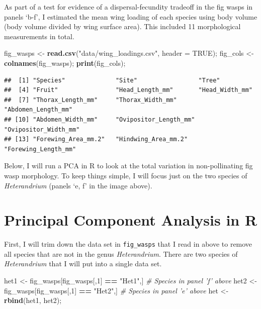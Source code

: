 \documentclass[]{article}
\newenvironment{Shaded}{\begin{snugshade}}{\end{snugshade}}
\newcommand{\CommentTok}[1]{\textcolor[rgb]{0.56,0.35,0.01}{\textit{#1}}}
\newcommand{\DataTypeTok}[1]{\textcolor[rgb]{0.13,0.29,0.53}{#1}}
\newcommand{\DecValTok}[1]{\textcolor[rgb]{0.00,0.00,0.81}{#1}}
\newcommand{\KeywordTok}[1]{\textcolor[rgb]{0.13,0.29,0.53}{\textbf{#1}}}
\newcommand{\NormalTok}[1]{#1}
\newcommand{\OperatorTok}[1]{\textcolor[rgb]{0.81,0.36,0.00}{\textbf{#1}}}
\newcommand{\OtherTok}[1]{\textcolor[rgb]{0.56,0.35,0.01}{#1}}
\newcommand{\StringTok}[1]{\textcolor[rgb]{0.31,0.60,0.02}{#1}}
\begin{document}
As part of a test for evidence of a dispersal-fecundity tradeoff in the
fig wasps in panels `b-f', I estimated the mean wing loading of each
species using body volume (body volume divided by wing surface area).
This included 11 morphological measurements in total.

\begin{Shaded}
\begin{Highlighting}[]
\NormalTok{fig_wasps    <-}\StringTok{ }\KeywordTok{read.csv}\NormalTok{(}\StringTok{"data/wing_loadings.csv"}\NormalTok{, }\DataTypeTok{header =} \OtherTok{TRUE}\NormalTok{);}
\NormalTok{fig_cols     <-}\StringTok{ }\KeywordTok{colnames}\NormalTok{(fig_wasps);}
\KeywordTok{print}\NormalTok{(fig_cols);}
\end{Highlighting}
\end{Shaded}

\begin{verbatim}
##  [1] "Species"              "Site"                 "Tree"                
##  [4] "Fruit"                "Head_Length_mm"       "Head_Width_mm"       
##  [7] "Thorax_Length_mm"     "Thorax_Width_mm"      "Abdomen_Length_mm"   
## [10] "Abdomen_Width_mm"     "Ovipositor_Length_mm" "Ovipositor_Width_mm" 
## [13] "Forewing_Area_mm.2"   "Hindwing_Area_mm.2"   "Forewing_Length_mm"
\end{verbatim}

Below, I will run a PCA in R to look at the total variation in
non-pollinating fig wasp morphology. To keep things simple, I will focus
just on the two species of \emph{Heterandrium} (panels `e, f' in the
image above).

\hypertarget{principal-component-analysis-in-r}{%
\section{Principal Component Analysis in
R}\label{principal-component-analysis-in-r}}

First, I will trim down the data set in \texttt{fig\_wasps} that I read
in above to remove all species that are not in the genus
\emph{Heterandrium}. There are two species of \emph{Heterandrium} that I
will put into a single data set.

\begin{Shaded}
\begin{Highlighting}[]
\NormalTok{het1 <-}\StringTok{ }\NormalTok{fig_wasps[fig_wasps[,}\DecValTok{1}\NormalTok{] }\OperatorTok{==}\StringTok{ "Het1"}\NormalTok{,] }\CommentTok{# Species in panel 'f' above}
\NormalTok{het2 <-}\StringTok{ }\NormalTok{fig_wasps[fig_wasps[,}\DecValTok{1}\NormalTok{] }\OperatorTok{==}\StringTok{ "Het2"}\NormalTok{,] }\CommentTok{# Species in panel 'e' above}
\NormalTok{het  <-}\StringTok{ }\KeywordTok{rbind}\NormalTok{(het1, het2);}
\end{Highlighting}
\end{Shaded}
\end{document}
